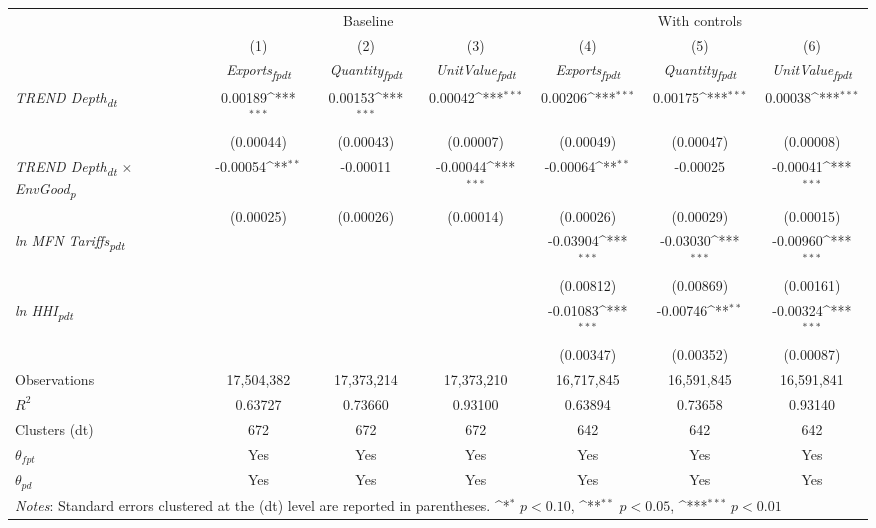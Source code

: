 {
\def\sym#1{\ifmmode^{#1}\else\(^{#1}\)\fi}
\begin{tabular}{l*{6}{c}}
\toprule
&\multicolumn{3}{c}{Baseline}&\multicolumn{3}{c}{With controls}\\\cmidrule(lr){2-4}\cmidrule(lr){5-7}
&(1)&(2)&(3)&(4)&(5)&(6)\\
&\textit{Exports\textsubscript{fpdt}}&\textit{Quantity\textsubscript{fpdt}}&\textit{UnitValue\textsubscript{fpdt}}&\textit{Exports\textsubscript{fpdt}}&\textit{Quantity\textsubscript{fpdt}}&\textit{UnitValue\textsubscript{fpdt}}\\
\midrule
\textit{TREND Depth\textsubscript{dt}} & 0.00189\sym{***} & 0.00153\sym{***} & 0.00042\sym{***} & 0.00206\sym{***} & 0.00175\sym{***} & 0.00038\sym{***}\\
 & (0.00044) & (0.00043) & (0.00007) & (0.00049) & (0.00047) & (0.00008)\\
\addlinespace
\textit{TREND Depth\textsubscript{dt} $\times$ EnvGood\textsubscript{p}} & -0.00054\sym{**} & -0.00011 & -0.00044\sym{***} & -0.00064\sym{**} & -0.00025 & -0.00041\sym{***}\\
 & (0.00025) & (0.00026) & (0.00014) & (0.00026) & (0.00029) & (0.00015)\\
\addlinespace
\textit{ln MFN Tariffs\textsubscript{pdt}} &  &  &  & -0.03904\sym{***} & -0.03030\sym{***} & -0.00960\sym{***}\\
 &  &  &  & (0.00812) & (0.00869) & (0.00161)\\
\addlinespace
\textit{ln HHI\textsubscript{pdt}} &  &  &  & -0.01083\sym{***} & -0.00746\sym{**} & -0.00324\sym{***}\\
 &  &  &  & (0.00347) & (0.00352) & (0.00087)\\
\midrule
Observations & 17,504,382 & 17,373,214 & 17,373,210 & 16,717,845 & 16,591,845 & 16,591,841\\
$R^{2}$ & 0.63727 & 0.73660 & 0.93100 & 0.63894 & 0.73658 & 0.93140\\
Clusters (dt) & 672 & 672 & 672 & 642 & 642 & 642\\
$\theta_{fpt}$ & Yes & Yes & Yes & Yes & Yes & Yes\\
$\theta_{pd}$ & Yes & Yes & Yes & Yes & Yes & Yes\\
\bottomrule
\multicolumn{7}{l}{\footnotesize \textit{Notes}: Standard errors clustered at the (dt) level are reported in parentheses. \sym{*} \(p<0.10\), \sym{**} \(p<0.05\), \sym{***} \(p<0.01\)}\\
\end{tabular}
}
